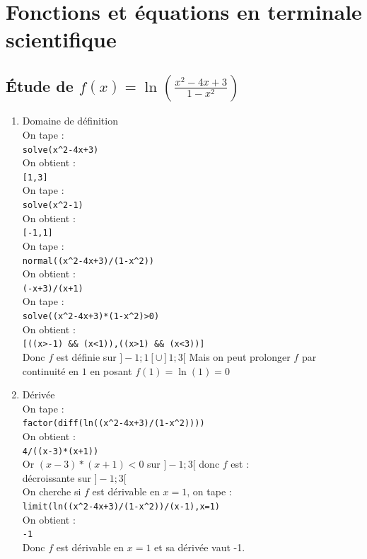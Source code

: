 \documentclass[a4paper,11pt]{book}
\begin{document}
\chapter{Fonctions et \'equations en terminale scientifique}
\section{\'Etude de $\displaystyle f(x)=\ln(\frac{x^2-4x+3}{1-x^2})$}
\begin{enumerate}
\item Domaine de d\'efinition\\
On tape :\\
{\tt solve(x\verb|^|2-4x+3)}\\
On obtient :\\
{\tt [1,3]}\\
On tape :\\
{\tt solve(x\verb|^|2-1)}\\
On obtient :\\
{\tt [-1,1]}\\
On tape :\\
{\tt normal((x\verb|^|2-4x+3)/(1-x\verb|^|2))}\\
On obtient :\\
{\tt (-x+3)/(x+1)}\\
On tape :\\
{\tt solve((x\verb|^|2-4x+3)*(1-x\verb|^|2)>0)}\\
On obtient :\\
{\tt [((x>-1) \&\& (x<1)),((x>1) \&\& (x<3))]}\\
Donc $f$ est d\'efinie sur $]-1;1[\cup]1;3[$
Mais on peut prolonger $f$ par continuit\'e en $1$ en posant $f(1)=\ln(1)=0$
\item D\'eriv\'ee\\
On tape :\\
{\tt factor(diff(ln((x\verb|^|2-4x+3)/(1-x\verb|^|2))))}\\
On obtient :\\
{\tt 4/((x-3)*(x+1))}\\
Or $(x-3)*(x+1)<0$ sur  $]-1; 3[$ donc $f$ est :\\
d\'ecroissante sur $]-1; 3[$\\
On cherche si $f$ est d\'erivable en $x=1$, on tape :\\
{\tt limit(ln((x\verb|^|2-4x+3)/(1-x\verb|^|2))/(x-1),x=1)}\\
On obtient :\\
{\tt -1}\\
Donc $f$ est d\'erivable en $x=1$ et sa d\'eriv\'ee vaut -1.

\end{enumerate}
\end{document}
